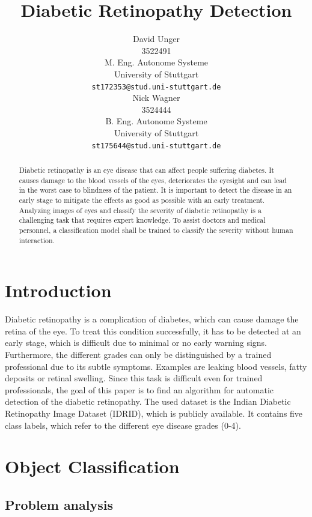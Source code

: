 \documentclass{article}
\title{Diabetic Retinopathy Detection}
\author{
  David Unger\\
  3522491 \\
  M. Eng. Autonome Systeme\\
  University of Stuttgart\\
  \texttt{st172353@stud.uni-stuttgart.de} \\
  \And
  Nick Wagner\\
  3524444 \\
  B. Eng. Autonome Systeme\\
  University of Stuttgart\\
  \texttt{st175644@stud.uni-stuttgart.de} \\
}
\begin{document}
\maketitle

\begin{abstract}
Diabetic retinopathy is an eye disease that can affect people suffering diabetes. It causes damage to the blood vessels of 
the eyes, deteriorates the eyesight and can lead in the worst case to blindness of the patient. It is important to 
detect the disease in an early stage to mitigate the effects as good as possible with an early treatment. Analyzing images of 
eyes and classify the severity of diabetic retinopathy is a challenging task that requires expert knowledge. To assist 
doctors and medical personnel, a classification model shall be trained to classify the severity without human interaction. 
\end{abstract}

\section{Introduction}
Diabetic retinopathy is a complication of diabetes, which can cause damage the retina of the eye. 
To treat this condition successfully, it has to be detected at an early stage, which is difficult due to minimal or no early warning signs. 
Furthermore, the different grades can only be distinguished by a trained professional due to its subtle symptoms.
Examples are leaking blood vessels, fatty deposits or retinal swelling.
Since this task is difficult even for trained professionals, the goal of this paper is to find an algorithm for automatic
detection of the diabetic retinopathy. The used dataset is the Indian Diabetic Retinopathy Image Dataset (IDRID), which 
is publicly available. It contains five class labels, which refer to 
the different eye disease grades (0-4).

\section{Object Classification}
\subsection{Problem analysis}
\end{document}
